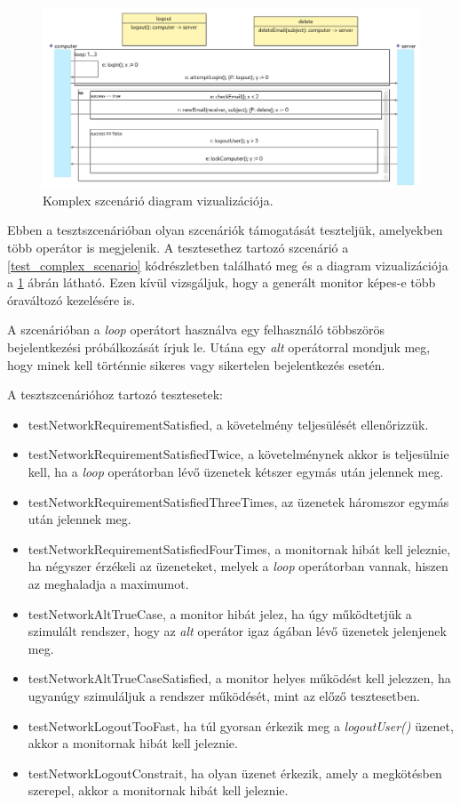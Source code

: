 \begin{figure}[!ht]
    \centering
    \includegraphics[width=160mm, keepaspectratio]{figures/diagramOperatorExample.png}
    \caption{Komplex szcenárió diagram vizualizációja.}
    \label{test_complex_diagram}
\end{figure}

Ebben a tesztszcenárióban olyan szcenáriók támogatását teszteljük, amelyekben több operátor is megjelenik.
A tesztesethez tartozó szcenárió a \ref{test_complex_scenario} kódrészletben található meg és a diagram vizualizációja a \ref{test_complex_diagram} ábrán látható.
Ezen kívül vizsgáljuk, hogy a generált monitor képes-e több óraváltozó kezelésére is.

A szcenárióban a \textit{loop} operátort használva egy felhasználó többszörös bejelentkezési próbálkozását írjuk le.
Utána egy \textit{alt} operátorral mondjuk meg, hogy minek kell történnie sikeres vagy sikertelen bejelentkezés esetén.

A tesztszcenárióhoz tartozó tesztesetek:
\begin{itemize}
    \item testNetworkRequirementSatisfied, a követelmény teljesülését ellenőrizzük.
    \item testNetworkRequirementSatisfiedTwice, a követelménynek akkor is teljesülnie kell, ha a \textit{loop} operátorban lévő üzenetek kétszer egymás után jelennek meg.
    \item testNetworkRequirementSatisfiedThreeTimes, az üzenetek háromszor egymás után jelennek meg.
    \item testNetworkRequirementSatisfiedFourTimes, a monitornak hibát kell jeleznie, ha négyszer érzékeli az üzeneteket, melyek a \textit{loop} operátorban vannak, hiszen az meghaladja a maximumot.
    \item testNetworkAltTrueCase, a monitor hibát jelez, ha úgy működtetjük a szimulált rendszer, hogy az \textit{alt} operátor igaz ágában lévő üzenetek jelenjenek meg.
    \item testNetworkAltTrueCaseSatisfied, a monitor helyes működést kell jelezzen, ha ugyanúgy szimuláljuk a rendszer működését, mint az előző tesztesetben.
    \item testNetworkLogoutTooFast, ha túl gyorsan érkezik meg a \textit{logoutUser()} üzenet, akkor a monitornak hibát kell jeleznie.
    \item testNetworkLogoutConstrait, ha olyan üzenet érkezik, amely a megkötésben szerepel, akkor a monitornak hibát kell jeleznie.
\end{itemize}

